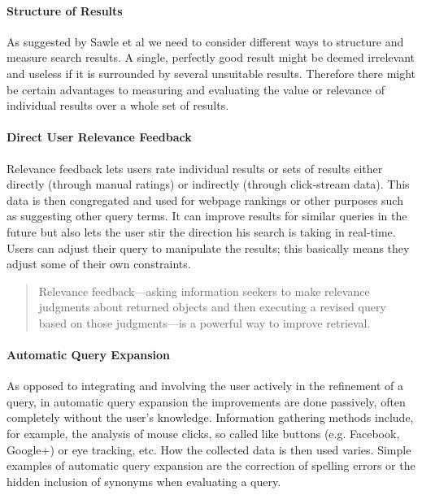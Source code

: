 \paragraph{Structure of Results} As suggested by Sawle et al \autocite*{Sawle2011} we need to consider different ways to structure and measure search results. A single, perfectly good result might be deemed irrelevant and useless if it is surrounded by several unsuitable results. Therefore there might be certain advantages to measuring and evaluating the value or relevance of individual results over a whole set of results.

\paragraph{Direct User Relevance Feedback} Relevance feedback lets users rate individual results or sets of results either directly (through manual ratings) or indirectly (through click-stream data). This data is then congregated and used for webpage rankings or other purposes such as suggesting other query terms. It can improve results for similar queries in the future but also lets the user stir the direction his search is taking in real-time. Users can adjust their query to manipulate the results; this basically means they adjust some of their own constraints.

\begin{quotation}
  Relevance feedback---asking information seekers to make relevance judgments about returned objects and then executing a revised query based on those judgments---is a powerful way to improve retrieval. 
\end{quotation}

\paragraph{Automatic Query Expansion} As opposed to integrating and involving the user actively in the refinement of a query, in automatic query expansion the improvements are done passively, often completely without the user’s knowledge. Information gathering methods include, for example, the analysis of mouse clicks, so called like buttons (e.g. Facebook, Google+) or eye tracking, etc. How the collected data is then used varies. Simple examples of automatic query expansion are the correction of spelling errors or the hidden inclusion of synonyms when evaluating a query.

\spirals

